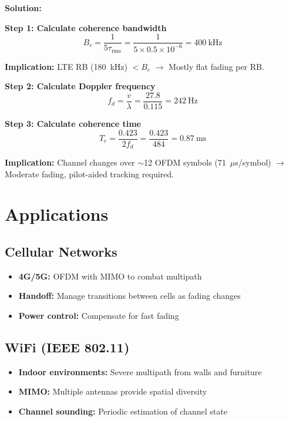\textbf{Solution:}

\textbf{Step 1: Calculate coherence bandwidth}
\begin{equation*}
B_c = \frac{1}{5\tau_{\text{rms}}} = \frac{1}{5 \times 0.5 \times 10^{-6}} = 400~\text{kHz}
\end{equation*}

\textbf{Implication:} LTE RB (180~kHz) $< B_c$ $\rightarrow$ Mostly flat fading per RB.

\textbf{Step 2: Calculate Doppler frequency}
\begin{equation*}
f_d = \frac{v}{\lambda} = \frac{27.8}{0.115} = 242~\text{Hz}
\end{equation*}

\textbf{Step 3: Calculate coherence time}
\begin{equation*}
T_c = \frac{0.423}{2f_d} = \frac{0.423}{484} = 0.87~\text{ms}
\end{equation*}

\textbf{Implication:} Channel changes over $\sim$12 OFDM symbols (71~$\mu$s/symbol) $\rightarrow$ Moderate fading, pilot-aided tracking required.

\section{Applications}

\subsection{Cellular Networks}
\begin{itemize}
\item \textbf{4G/5G:} OFDM with MIMO to combat multipath
\item \textbf{Handoff:} Manage transitions between cells as fading changes
\item \textbf{Power control:} Compensate for fast fading
\end{itemize}

\subsection{WiFi (IEEE 802.11)}
\begin{itemize}
\item \textbf{Indoor environments:} Severe multipath from walls and furniture
\item \textbf{MIMO:} Multiple antennas provide spatial diversity
\item \textbf{Channel sounding:} Periodic estimation of channel state
\end{itemize}

